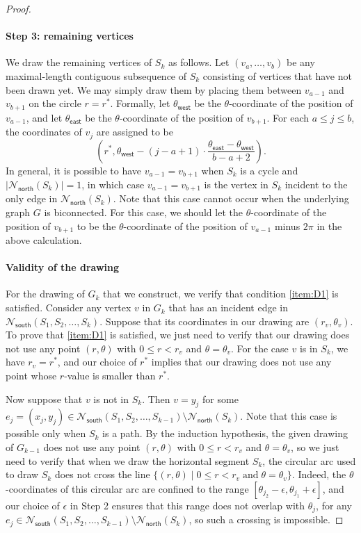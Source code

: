 \documentclass{article}\usepackage[a4paper,margin=20mm]{geometry}
\newcommand{\thetawest}{\theta_{\mathsf{west}}}
\newcommand{\thetaeast}{\theta_{\mathsf{east}}}
\newcommand{\Nnorth}{\mathcal{N}_\mathsf{north}}
\newcommand{\Nsouth}{\mathcal{N}_\mathsf{south}}
\begin{document}
\begin{proof}
\paragraph{Step 3: remaining vertices}
We draw the remaining vertices of $S_k$ as follows. 
Let $(v_{a}, \ldots, v_b)$ be any maximal-length contiguous subsequence of $S_k$ consisting of vertices that have not been drawn yet. We may simply draw them by placing them between $v_{a-1}$ and $v_{b+1}$ on the circle $r = r^\ast$. Formally, let $\thetawest$ be the $\theta$-coordinate of the position of $v_{a-1}$, and let $\thetaeast$ be the $\theta$-coordinate of the position of $v_{b+1}$.  
For each $a \leq j \leq b$, the coordinates of $v_j$ are assigned to be \[\left(r^\ast, \thetawest - (j-a+1) \cdot \frac{\thetaeast - \thetawest}{b-a+2}\right).\]
In general, it is possible to have $v_{a-1}=v_{b+1}$ when $S_k$ is a cycle and $|\Nnorth(S_k)| = 1$, in which case $v_{a-1}=v_{b+1}$ is the vertex in $S_k$ incident to the only edge in $\Nnorth(S_k)$. Note that this case cannot occur when the underlying graph $G$ is biconnected. For this case, we should let the $\theta$-coordinate of the position of $v_{b+1}$ to be the $\theta$-coordinate of the position of $v_{a-1}$ minus $2\pi$ in the above calculation. 
 

\paragraph{Validity of the drawing} For the drawing of $G_k$ that we construct, we verify that condition \ref{item:D1} is satisfied. %
Consider any vertex $v$ in $G_k$ that has an incident edge in $\Nsouth(S_1, S_2, \ldots, S_k)$. Suppose that its coordinates in our drawing are $(r_v, \theta_v)$. To prove that \ref{item:D1} is satisfied, we just need to verify that our drawing does not use any point $(r,\theta)$ with $0\leq r < r_v$ and $\theta = \theta_v$. For the case $v$ is in $S_k$, we have $r_v = r^\ast$, and our choice of $r^\ast$ implies that our drawing does not use any point whose $r$-value is smaller than $r^\ast$. 

Now suppose that $v$ is not in $S_k$.  Then $v=y_j$ for some $e_j=(x_j, y_j) \in \Nsouth(S_1, S_2, \ldots, S_{k-1}) \setminus \Nnorth(S_k)$. Note that this case is possible only when $S_k$ is a path. By the induction hypothesis, the given drawing of $G_{k-1}$ does not use any point $(r,\theta)$ with $0\leq r < r_v$ and $\theta = \theta_v$, so we just need to verify that when we draw the horizontal segment $S_k$, the circular arc used to draw $S_k$ does not cross the line $\{ (r,\theta) \mid 0\leq r < r_v \; \text{and} \; \theta = \theta_v\}$. Indeed, the $\theta$-coordinates of this circular arc are confined to the range $[\theta_{j_2}-\epsilon, \theta_{j_1}+\epsilon]$, and our choice of $\epsilon$ in Step 2 ensures that this range does not overlap with  $\theta_j$, for any $e_j \in \Nsouth(S_1, S_2, \ldots, S_{k-1}) \setminus \Nnorth(S_k)$, so such a crossing is impossible. 


\end{proof}
\end{document}
